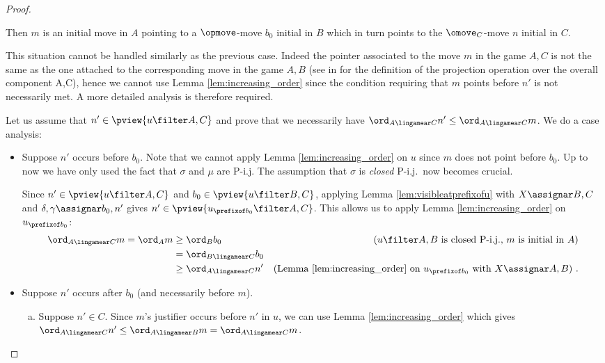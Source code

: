 \begin{proof}
\begin{enumerate}[1)]
        Then $m$ is an initial move in $A$
        pointing to a $\opmove$-move
        $b_0$ initial in $B$ which in turn points to the $\omove_C$-move $n$ initial in $C$.

        This situation cannot be handled similarly as the
        previous case. Indeed the pointer associated to the move
        $m$ in the game $A,C$ is not the same as the one
        attached to the corresponding move in the game $A,B$
        (see in \cite{Abr02} for the definition of the
        projection operation over the overall component A,C),
        hence we cannot use Lemma \ref{lem:increasing_order}
        since the condition requiring that $m$ points before
        $n'$ is not necessarily met. A more detailed analysis is
        therefore required.

        Let us assume that $n'\in \pview{u\filter A,C}$ and
        prove that we necessarily have $\ord_{A\lingamear C} n'
        \leq \ord_{A\lingamear C} m$. We do a case analysis:
        \begin{itemize}[-]
        \item Suppose $n'$ occurs before $b_0$.
        Note that we cannot apply Lemma \ref{lem:increasing_order} on $u$
        since $m$ does not point before $b_0$.
        Up to now we have only used the fact that $\sigma$ and $\mu$ are P-i.j. The assumption that $\sigma$ is  \emph{closed} P-i.j.\ now becomes crucial.

        Since $n' \in \pview{u\filter A,C}$ and
        $b_0 \in \pview{u\filter B,C}$, applying Lemma \ref{lem:visibleatprefixofu}
        with $X\assignar B,C$ and $\delta,\gamma \assignar b_0,n'$ gives
        $n' \in \pview{u_{\prefixof b_0}\filter A,C}$. This allows us to apply Lemma \ref{lem:increasing_order} on $u_{\prefixof b_0}$:
            \begin{align*}
            \ord_{A\lingamear C} m
            = \ord_A m
            & \geq \ord_B b_0 & \mbox{($u \filter A,B$ is closed P-i.j., $m$ is initial in $A$)} \\
            & = \ord_{B\lingamear C} b_0  \\
            & \geq \ord_{A\lingamear C} n' & \mbox{(Lemma \ref{lem:increasing_order} on $u_{\prefixof b_0}$ with $X\assignar A,B$)} \ .
            \end{align*}

        \item Suppose $n'$ occurs after $b_0$ (and necessarily before $m$).

            \begin{enumerate}[a.]
            \item Suppose $n'\in C$. Since $m$'s justifier occurs before $n'$ in $u$, we can use Lemma \ref{lem:increasing_order} which gives $\ord_{A\lingamear C} n' \leq \ord_{A\lingamear B} m
                = \ord_{A\lingamear C} m$.


\end{enumerate}
\end{itemize}
\end{enumerate}
\end{proof}
